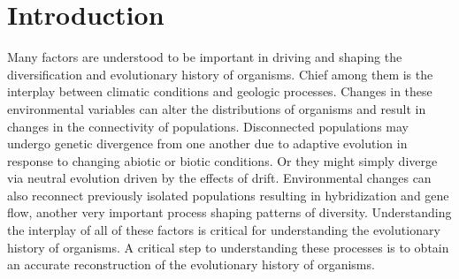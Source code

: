 

\section{Introduction}

Many factors are understood to be important in driving and shaping the 
diversification and evolutionary history of organisms. 
Chief among them is the interplay between climatic conditions and geologic processes.
Changes in these environmental variables can alter the distributions of organisms
and result in changes in the connectivity of populations.
Disconnected populations may undergo genetic divergence from one another due 
to adaptive evolution in response to changing abiotic or biotic conditions. 
Or they might simply diverge via neutral evolution driven by the effects of drift.
Environmental changes can also reconnect previously isolated populations resulting
in hybridization and gene flow, another very important process shaping patterns of diversity.
Understanding the interplay of all of these factors is critical for understanding
the evolutionary history of organisms.
A critical step to understanding these processes is to obtain an accurate 
reconstruction  of the evolutionary history of organisms. 


